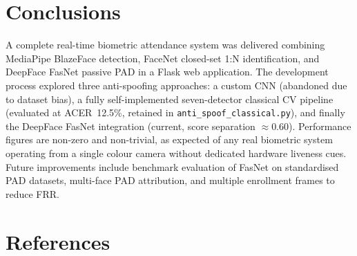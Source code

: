 \documentclass[10pt,a4paper]{article}
\begin{document}
\section{Conclusions}
\label{sec:conclusions}

A complete real-time biometric attendance system was delivered combining MediaPipe
BlazeFace detection, FaceNet closed-set 1:N identification, and DeepFace FasNet
passive PAD in a Flask web application.
The development process explored three anti-spoofing approaches: a custom CNN
(abandoned due to dataset bias), a fully self-implemented seven-detector classical CV
pipeline (evaluated at ACER~12.5\%, retained in \texttt{anti\_spoof\_classical.py}),
and finally the DeepFace FasNet integration (current, score separation $\approx\!0.60$).
Performance figures are non-zero and non-trivial, as expected of any real biometric
system operating from a single colour camera without dedicated hardware liveness cues.
Future improvements include benchmark evaluation of FasNet on standardised PAD
datasets, multi-face PAD attribution, and multiple enrollment frames to reduce FRR.

\newpage
\section*{References}
\end{document}
